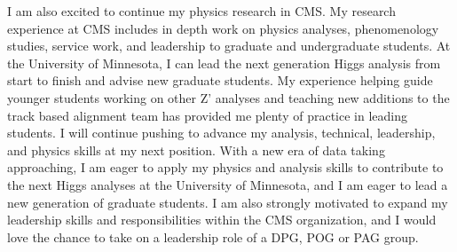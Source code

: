 \documentclass[11pt]{article}
\begin{document}



I am also excited to continue my physics research in CMS. My research experience at CMS includes in depth work on physics analyses, phenomenology studies, service work, and leadership to graduate and undergraduate students. At the University of Minnesota, I can lead the next generation Higgs analysis from start to finish and advise new graduate students. My experience helping guide younger students working on other Z' analyses and teaching new additions to the track based alignment team has provided me plenty of practice in leading students. I will continue pushing to advance my analysis, technical, leadership, and physics skills at my next position. With a new era of data taking approaching, I am eager to apply my physics and analysis skills to contribute to the next Higgs analyses at the University of Minnesota, and I am eager to lead a new generation of graduate students. I am also strongly motivated to expand my leadership skills and responsibilities within the CMS organization, and I would love the chance to take on a leadership role of a DPG, POG or PAG group.
\end{document}
